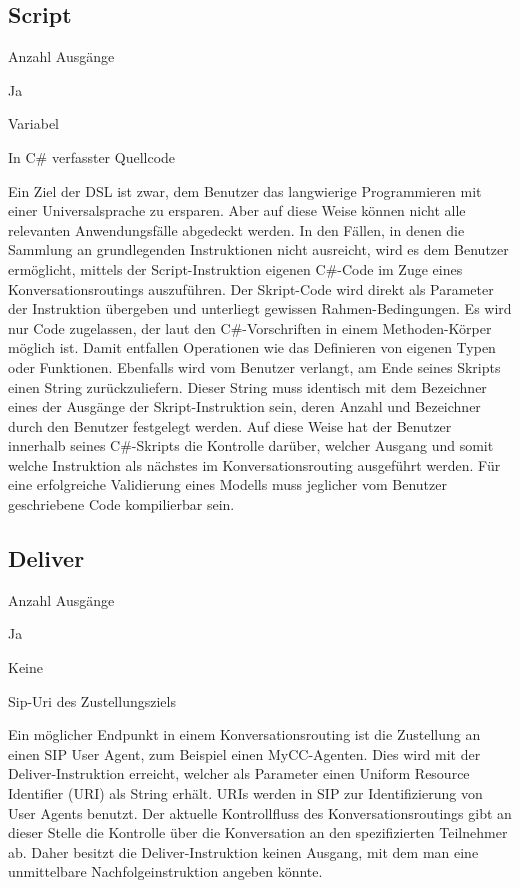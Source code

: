 \subsection{Script}
\label{subsec:Script}
\begin{labeling}{Anzahl Ausgänge}
\item [Eingang] Ja
\item [Anzahl Ausgänge] Variabel
\item [Parameter] In C\# verfasster Quellcode
\item [Beschreibung] Ein Ziel der DSL ist zwar, dem Benutzer das langwierige Programmieren mit einer Universalsprache zu ersparen. Aber auf diese Weise können nicht alle relevanten Anwendungsfälle abgedeckt werden. In den Fällen, in denen die Sammlung an grundlegenden Instruktionen nicht ausreicht, wird es dem Benutzer ermöglicht, mittels der Script-Instruktion eigenen C\#-Code im Zuge eines Konversationsroutings auszuführen. Der Skript-Code wird direkt als Parameter der Instruktion übergeben und unterliegt gewissen Rahmen-Bedingungen. Es wird nur Code zugelassen, der laut den C\#-Vorschriften in einem Methoden-Körper möglich ist. Damit entfallen Operationen wie das Definieren von eigenen Typen oder Funktionen. Ebenfalls wird vom Benutzer verlangt, am Ende seines Skripts einen String zurückzuliefern. Dieser String muss identisch mit dem Bezeichner eines der Ausgänge der Skript-Instruktion sein, deren Anzahl und Bezeichner durch den Benutzer festgelegt werden. Auf diese Weise hat der Benutzer innerhalb seines C\#-Skripts die Kontrolle darüber, welcher Ausgang und somit welche Instruktion als nächstes im Konversationsrouting ausgeführt werden. Für eine erfolgreiche Validierung eines Modells muss jeglicher vom Benutzer geschriebene Code kompilierbar sein.   
\end{labeling}

\subsection{Deliver}
\label{subsec:Deliver}
\begin{labeling}{Anzahl Ausgänge}
\item [Eingang] Ja
\item [Anzahl Ausgänge] Keine
\item [Parameter] Sip-Uri des Zustellungsziels
\item [Beschreibung] Ein möglicher Endpunkt in einem Konversationsrouting ist die Zustellung an einen SIP User Agent, zum Beispiel einen MyCC-Agenten. Dies wird mit der Deliver-Instruktion erreicht, welcher als Parameter einen Uniform Resource Identifier (URI) als String erhält. URIs werden in SIP zur Identifizierung von User Agents benutzt. Der aktuelle Kontrollfluss des Konversationsroutings gibt an dieser Stelle die Kontrolle über die Konversation an den spezifizierten Teilnehmer ab. Daher besitzt die Deliver-Instruktion keinen Ausgang, mit dem man eine unmittelbare Nachfolgeinstruktion angeben könnte.
\end{labeling}

